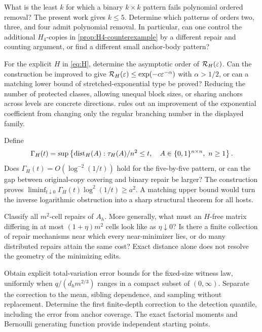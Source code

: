 \begin{question}
What is the least \(k\) for which a binary \(k\times k\) pattern
fails polynomial ordered removal? The present work gives \(k\le5\).
Determine which patterns of orders two, three, and four admit
polynomial removal. In particular, can one control the additional
\(H_4\)-copies in \cref{prop:H4-counterexample} by a different repair
and counting argument, or find a different small anchor-body pattern?
\end{question}

\begin{question}
For the explicit \(H\) in \eqref{eq:H}, determine the asymptotic
order of \(\mathcal R_H(\varepsilon)\). Can the construction be improved
to give \(\mathcal R_H(\varepsilon)\le\exp(-c\varepsilon^{-\alpha})\) with
\(\alpha>1/2\), or can a matching lower bound of stretched-exponential
type be proved? Reducing the number of protected classes, allowing
unequal block sizes, or sharing anchors across levels are concrete
directions.  rules out an improvement of
the exponential coefficient from changing only the regular branching
number in the displayed family.
\end{question}

\begin{question}
Define
\[
 \Gamma_H(t)=\sup\left\{\dist_H(A):
         \tau_H(A)/n^2\le t,\quad A\in\{0,1\}^{n\times n},\ n\ge1\right\}.
\]
Does \(\Gamma_H(t)=O(\log^{-2}(1/t))\) hold for the five-by-five
pattern, or can the gap between original-copy covering and binary
repair be larger? The construction proves
\(\liminf_{t\downarrow0}\Gamma_H(t)\log^2(1/t)\ge a^2\).
A matching upper bound would turn the inverse logarithmic obstruction
into a sharp structural theorem for all hosts.
\end{question}

\begin{question}
Classify all \(m^2\)-cell repairs of \(A_h\). More generally, what
must an \(H\)-free matrix differing in at most \((1+\eta)m^2\)
cells look like as \(\eta\downarrow0\)? Is there a finite collection
of repair mechanisms near which every near-minimizer lies, or do
many distributed repairs attain the same cost? Exact distance alone
does not resolve the geometry of the minimizing edits.
\end{question}

\begin{question}
Obtain explicit total-variation error bounds for the fixed-size
witness law, uniformly when \(q/(d_hm^{2/3})\) ranges in a compact
subset of \((0,\infty)\). Separate the correction to the mean,
sibling dependence, and sampling without replacement. Determine the
first finite-depth correction to the detection quantile, including
the error from anchor coverage. The exact factorial moments and
Bernoulli generating function provide independent starting points.
\end{question}

